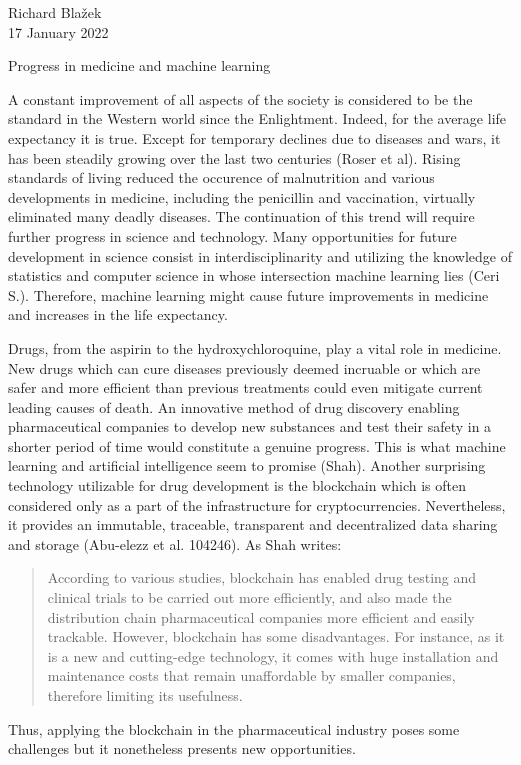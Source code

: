 \documentclass[a4paper,12pt]{article}
\begin{document}
Richard Blažek\\
17 January 2022
\begin{center}
\large Progress in medicine and machine learning
\end{center}
\setlength\parindent{0.5in}

A constant improvement of all aspects of the society is considered to be the standard in the Western world since the Enlightment. Indeed, for the average life expectancy it is true. Except for temporary declines due to diseases and wars, it has been steadily growing over the last two centuries (Roser et al). Rising standards of living reduced the occurence of malnutrition and various developments in medicine, including the penicillin and vaccination, virtually eliminated many deadly diseases. The continuation of this trend will require further progress in science and technology. Many opportunities for future development in science consist in interdisciplinarity and utilizing the knowledge of statistics and computer science in whose intersection machine learning lies (Ceri S.). Therefore, machine learning might cause future improvements in medicine and increases in the life expectancy.

Drugs, from the aspirin to the hydroxychloroquine, play a vital role in medicine. New drugs which can cure diseases previously deemed incruable or which are safer and more efficient than previous treatments could even mitigate current leading causes of death. An innovative method of drug discovery enabling pharmaceutical companies to develop new substances and test their safety in a shorter period of time would constitute a genuine progress. This is what machine learning and artificial intelligence seem to promise (Shah). Another surprising technology utilizable for drug development is the blockchain which is often considered only as a part of the infrastructure for cryptocurrencies. Nevertheless, it provides an immutable, traceable, transparent and decentralized data sharing and storage (Abu-elezz et al. 104246). As Shah writes:
\begin{quotation}
According to various studies, blockchain has enabled drug testing and clinical trials to be carried out more efficiently, and also made the distribution chain pharmaceutical companies more efficient and easily trackable. However, blockchain has some disadvantages. For instance, as it is a new and cutting-edge technology, it comes with huge installation and maintenance costs that remain unaffordable by smaller companies, therefore limiting its usefulness.
\end{quotation}
Thus, applying the blockchain in the pharmaceutical industry poses some challenges but it nonetheless presents new opportunities.
\end{document}
